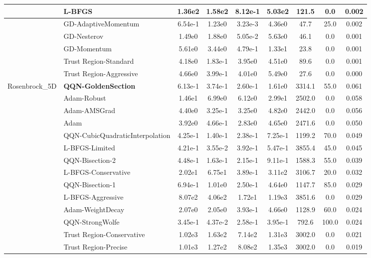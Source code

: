 \documentclass[10pt]{article}
\begin{document}
\begin{longtable}{|l|l|c|c|c|c|c|c|c|}
\hline
 & L-BFGS & 1.36e2 & 1.58e2 & 8.12e-1 & 5.03e2 & 121.5 & 0.0 & 0.002 \\
\hline
 & GD-AdaptiveMomentum & 6.54e-1 & 1.23e0 & 3.23e-3 & 4.36e0 & 47.7 & 25.0 & 0.002 \\
\hline
 & GD-Nesterov & 1.49e0 & 1.88e0 & 5.05e-2 & 5.63e0 & 46.1 & 0.0 & 0.001 \\
\hline
 & GD-Momentum & 5.61e0 & 3.44e0 & 4.79e-1 & 1.33e1 & 23.8 & 0.0 & 0.001 \\
\hline
 & Trust Region-Standard & 4.18e0 & 1.83e-1 & 3.95e0 & 4.51e0 & 89.6 & 0.0 & 0.001 \\
\hline
 & Trust Region-Aggressive & 4.66e0 & 3.99e-1 & 4.01e0 & 5.49e0 & 27.6 & 0.0 & 0.000 \\
Rosenbrock\_5D & \textbf{QQN-GoldenSection} & 6.13e-1 & 3.74e-1 & 2.60e-1 & 1.61e0 & 3314.1 & 55.0 & 0.061 \\
\hline
 & Adam-Robust & 1.46e1 & 6.99e0 & 6.12e0 & 2.99e1 & 2502.0 & 0.0 & 0.058 \\
\hline
 & Adam-AMSGrad & 4.40e0 & 3.25e-1 & 3.25e0 & 4.82e0 & 2442.0 & 0.0 & 0.056 \\
\hline
 & Adam & 3.92e0 & 4.66e-1 & 2.83e0 & 4.65e0 & 2471.6 & 0.0 & 0.050 \\
\hline
 & QQN-CubicQuadraticInterpolation & 4.25e-1 & 1.40e-1 & 2.38e-1 & 7.25e-1 & 1199.2 & 70.0 & 0.049 \\
\hline
 & L-BFGS-Limited & 4.21e-1 & 3.55e-2 & 3.92e-1 & 5.47e-1 & 3855.4 & 45.0 & 0.045 \\
\hline
 & QQN-Bisection-2 & 4.48e-1 & 1.63e-1 & 2.15e-1 & 9.11e-1 & 1588.3 & 55.0 & 0.039 \\
\hline
 & L-BFGS-Conservative & 2.02e1 & 6.75e1 & 3.89e-1 & 3.11e2 & 3106.7 & 20.0 & 0.032 \\
\hline
 & QQN-Bisection-1 & 6.94e-1 & 1.01e0 & 2.50e-1 & 4.64e0 & 1147.7 & 85.0 & 0.029 \\
\hline
 & L-BFGS-Aggressive & 8.07e2 & 4.06e2 & 1.72e1 & 1.19e3 & 3851.6 & 0.0 & 0.029 \\
\hline
 & Adam-WeightDecay & 2.07e0 & 2.05e0 & 3.93e-1 & 4.66e0 & 1128.9 & 60.0 & 0.024 \\
\hline
 & QQN-StrongWolfe & 3.45e-1 & 4.37e-2 & 2.58e-1 & 3.95e-1 & 792.6 & 100.0 & 0.024 \\
\hline
 & Trust Region-Conservative & 1.02e3 & 1.63e2 & 7.14e2 & 1.31e3 & 3002.0 & 0.0 & 0.021 \\
\hline
 & Trust Region-Precise & 1.01e3 & 1.27e2 & 8.08e2 & 1.35e3 & 3002.0 & 0.0 & 0.019 \\

\end{longtable}
\end{document}
